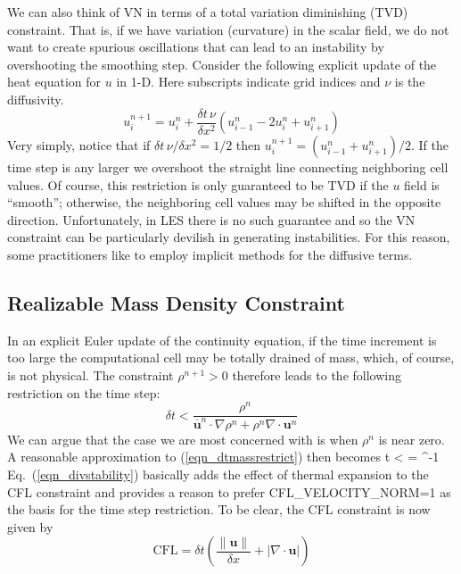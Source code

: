\documentclass[11pt]{book}
\begin{document}
We can also think of VN in terms of a total variation diminishing (TVD) constraint.  That is, if we have variation (curvature) in the scalar field, we do not want to create spurious oscillations that can lead to an instability by overshooting the smoothing step.  Consider the following explicit update of the heat equation for $u$ in 1-D. Here subscripts indicate grid indices and $\nu$ is the diffusivity.
\begin{equation}
u_i^{n+1} = u_i^n + \frac{\delta t \, \nu}{\delta x^2} (u_{i-1}^n - 2u_i^n + u_{i+1}^n )
\end{equation}
Very simply, notice that if $\delta t \, \nu/\delta x^2 = 1/2$ then $u_i^{n+1} = (u_{i-1}^n + u_{i+1}^n)/2$.  If the time step is any larger we overshoot the straight line connecting neighboring cell values.  Of course, this restriction is only guaranteed to be TVD if the $u$ field is ``smooth''; otherwise, the neighboring cell values may be shifted in the opposite direction.  Unfortunately, in LES there is no such guarantee and so the VN constraint can be particularly devilish in generating instabilities. For this reason, some practitioners like to employ implicit methods for the diffusive terms.

\subsection{Realizable Mass Density Constraint}

In an explicit Euler update of the continuity equation, if the time increment is too large the computational cell may be totally drained of mass, which, of course, is not physical. The constraint $\rho^{n+1}>0$ therefore leads to the following restriction on the time step:
\begin{equation}
\label{eqn_dtmassrestrict}
\delta t < \frac{\rho^n}{\overline{\mathbf{u}}^n\cdot\nabla\rho^n + \rho^n \nabla\cdot\mathbf{u}^n}
\end{equation}
We can argue that the case we are most concerned with is when $\rho^n$ is near zero.  A reasonable approximation to (\ref{eqn_dtmassrestrict}) then becomes
\be
\label{eqn_divstability}
\delta t < 
  = ^{-1}
\ee
Eq.~(\ref{eqn_divstability}) basically adds the effect of thermal expansion to the CFL constraint and provides a reason to prefer {\ct CFL\_VELOCITY\_NORM=1}
as the basis for the time step restriction. To be clear, the CFL constraint is now given by
\begin{equation}
\mbox{CFL} = \delta t \left( \frac{\|\mathbf{u}\|}{\delta x} + |\nabla\cdot\mathbf{u}| \right)
\end{equation}
\end{document}

